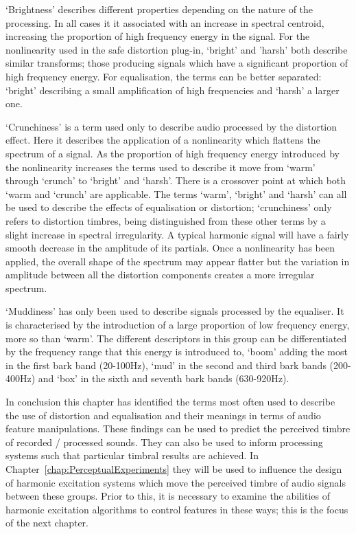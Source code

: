 	`Brightness' describes different properties depending on the nature of the processing. In all cases it it
	associated with an increase in spectral centroid, increasing the proportion of high frequency energy in the signal.
	For the nonlinearity used in the \acrshort{safe} distortion plug-in, `bright' and 'harsh' both describe similar
	transforms; those producing signals which have a significant proportion of high frequency energy. For equalisation,
	the terms can be better separated: `bright' describing a small amplification of high frequencies and `harsh' a
	larger one.

	`Crunchiness' is a term used only to describe audio processed by the distortion effect. Here it describes the
	application of a nonlinearity which flattens the spectrum of a signal. As the proportion of high frequency energy
	introduced by the nonlinearity increases the terms used to describe it move from `warm' through `crunch' to
	`bright' and `harsh'. There is a crossover point at which both `warm and `crunch' are applicable. The terms `warm',
	`bright' and `harsh' can all be used to describe the effects of equalisation or distortion; `crunchiness' only
	refers to distortion timbres, being distinguished from these other terms by a slight increase in spectral
	irregularity. A typical harmonic signal will have a fairly smooth decrease in the amplitude of its partials. Once a
	nonlinearity has been applied, the overall shape of the spectrum may appear flatter but the variation in amplitude
	between all the distortion components creates a more irregular spectrum.

	`Muddiness' has only been used to describe signals processed by the equaliser. It is characterised by the
	introduction of a large proportion of low frequency energy, more so than `warm'. The different descriptors in this
	group can be differentiated by the frequency range that this energy is introduced to, `boom' adding the most in the
	first bark band (20-100Hz), `mud' in the second and third bark bands (200-400Hz) and `box' in the sixth and seventh
	bark bands (630-920Hz).

	In conclusion this chapter has identified the terms most often used to describe the use of distortion and
	equalisation and their meanings in terms of audio feature manipulations. These findings can be used to predict the
	perceived timbre of recorded / processed sounds. They can also be used to inform processing systems such that
	particular timbral results are achieved. In Chapter~\ref{chap:PerceptualExperiments} they will be used to influence
	the design of harmonic excitation systems which move the perceived timbre of audio signals between these groups.
	Prior to this, it is necessary to examine the abilities of harmonic excitation algorithms to control features in
	these ways; this is the focus of the next chapter.
